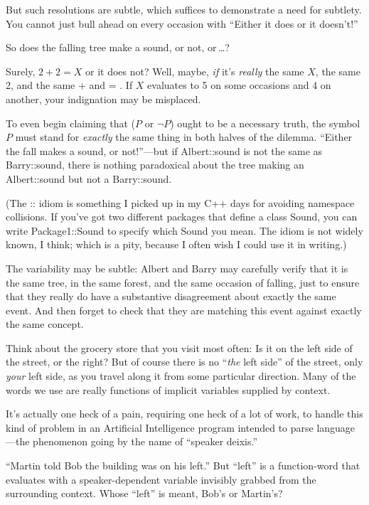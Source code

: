 {{{
 But such resolutions are subtle, which suffices to demonstrate a
need for subtlety. You cannot just bull ahead on every occasion with
``Either it does or it
doesn't!''}

{
 So does the falling tree make a sound, or not, or\,\ldots ?}

{
 Surely, $2 + 2 = X$ or it does not? Well, maybe, \textit{if}
it's \textit{really} the same $X$, the same 2, and the
same + and = . If $X$ evaluates to 5 on some occasions and 4 on another,
your indignation may be misplaced.}

{
 To even begin claiming that ($P$ or $\lnot P$) ought to be a
necessary truth, the symbol $P$ must stand for \textit{exactly} the same
thing in both halves of the dilemma. ``Either the fall
makes a sound, or not!''---but if Albert::sound is
not the same as Barry::sound, there is nothing paradoxical about the
tree making an Albert::sound but not a Barry::sound.}

{
 (The :: idiom is something I picked up in my C++ days for avoiding
namespace collisions. If you've got two different
packages that define a class Sound, you can write Package1::Sound to
specify which Sound you mean. The idiom is not widely known, I think;
which is a pity, because I often wish I could use it in writing.)}

{
 The variability may be subtle: Albert and Barry may carefully
verify that it is the same tree, in the same forest, and the same
occasion of falling, just to ensure that they really do have a
substantive disagreement about exactly the same event. And then forget
to check that they are matching this event against exactly the same
concept.}

{
 Think about the grocery store that you visit most often: Is it on
the left side of the street, or the right? But of course there is no
``\textit{the} left side'' of the
street, only \textit{your} left side, as you travel along it from some
particular direction. Many of the words we use are really functions of
implicit variables supplied by context.}

{
 It's actually one heck of a pain, requiring one
heck of a lot of work, to handle this kind of problem in an Artificial
Intelligence program intended to parse language---the phenomenon going
by the name of ``speaker deixis.''}

{
 ``Martin told Bob the building was on his
left.'' But
``left'' is a function-word that
evaluates with a speaker-dependent variable invisibly grabbed from the
surrounding context. Whose ``left''
is meant, Bob's or Martin's?}

}}
